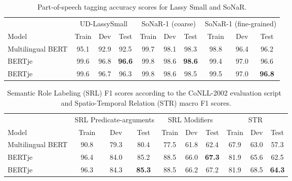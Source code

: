 \documentclass[11pt]{article}
\begin{document}
\begin{table}[t]
\begin{center}
  \begin{tabular}{l || c c c | c c c | c c c}
    \toprule
                   & \multicolumn{3}{c|}{UD-LassySmall} & \multicolumn{3}{c|}{SoNaR-1 (coarse)}    & \multicolumn{3}{c}{SoNaR-1 (fine-grained)}                                                \\
    Model          & Train   & Dev  & Test  & Train & Dev  & Test &                          Train & Dev  & Test              \\
    \midrule
    Multilingual BERT & 95.1 & 92.9 & 92.5                 & 99.7  & 98.1 & 98.3             & 98.8 & 96.4 & 96.2      \\
BERTje   & 99.6 & 96.8 & \textbf{96.6}        & 99.8  & 98.6 & \textbf{98.6}    & 99.4 & 97.0 & 96.6 \\
    BERTje            & 99.6 & 96.7 & 96.3                 & 99.8  & 98.6 & 98.5             & 99.5 & 97.0 & \textbf{96.8} \\
    \bottomrule
  \end{tabular}
   \caption{\label{table:pos} Part-of-speech tagging accuracy scores for Lassy Small and SoNaR.}
\end{center}
\end{table}


\begin{table}[H]
\begin{center}
  \begin{tabular}{l || c c c | c c c | c c c}
    \toprule
                   & \multicolumn{3}{c|}{SRL Predicate-arguments} & \multicolumn{3}{c|}{SRL Modifiers} & \multicolumn{3}{c}{STR}                                                   \\
    Model             & Train & Dev & Test           & Train & Dev & Test           & Train & Dev   & Test \\
    \midrule
    Multilingual BERT & 90.8 & 79.3 & 80.4           & 77.5 & 61.8 & 62.4           & 67.9 & 63.0 & 57.3 \\
    BERTje   & 96.4 & 84.0 & 85.2           & 88.5 & 66.0 & \textbf{67.3}  & 81.9 & 65.6 & 62.5 \\
    BERTje            & 96.3 & 84.3 & \textbf{85.3}  & 88.5 & 66.2 & 67.2           & 81.9 & 68.5 & \textbf{64.3} \\
    \bottomrule
  \end{tabular}
   \caption{\label{table:srl}Semantic Role Labeling (SRL) F1 scores according to the CoNLL-2002 evaluation script~\citep{tjong2002conll} and Spatio-Temporal Relation (STR) macro F1 scores.}
\end{center}
\end{table}
\end{document}
